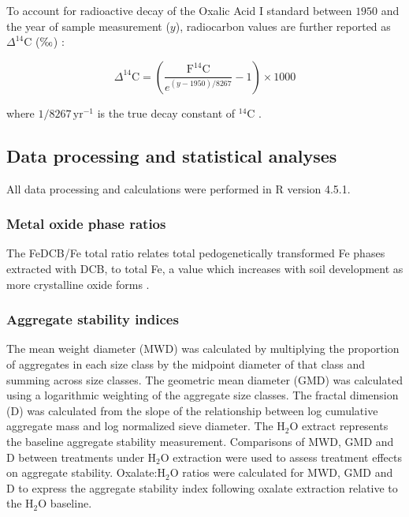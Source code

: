 \documentclass[preprint,12pt]{elsarticle}
\begin{document}
To account for radioactive decay of the Oxalic Acid I standard between $1950$ and the year of sample measurement ($y$), radiocarbon values are further reported as $\Delta^{14}\text{C}$ ($\text{\textperthousand}$) \citep{Trumbore2016}:

\begin{equation}
\Delta^{14}\text{C} = \left( \frac{\text{F}^{14}\text{C}}{e^{(y - 1950)/8267}} - 1 \right) \times 1000
\end{equation}

where $1/8267\,\text{yr}^{-1}$ is the true decay constant of $^{14}\text{C}$ \citep{Trumbore2016}.

\subsection{Data processing and statistical analyses}
\label{subsec:statistics}
All data processing and calculations were performed in R version 4.5.1.
  
\subsubsection{Metal oxide phase ratios}
The FeDCB/Fe total ratio relates total pedogenetically transformed Fe phases extracted with DCB, to total Fe, a value which increases with soil development as more crystalline oxide forms \citep{maier2025parent}.

\subsubsection{Aggregate stability indices}

The mean weight diameter (MWD) was calculated by multiplying the proportion of aggregates in each size class by the midpoint diameter of that class and summing across size classes. The geometric mean diameter (GMD) was calculated using a logarithmic weighting of the aggregate size classes. The fractal dimension (D) was calculated from the slope of the relationship between log cumulative aggregate mass and log normalized sieve diameter. The H$_2$O extract represents the baseline aggregate stability measurement. Comparisons of MWD, GMD and D between treatments under H$_2$O extraction were used to assess treatment effects on aggregate stability. Oxalate:H$_2$O ratios were calculated for MWD, GMD and D to express the aggregate stability index following oxalate extraction relative to the H$_2$O baseline.
\end{document}
